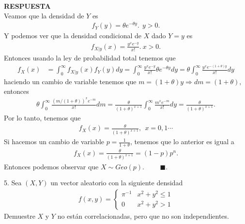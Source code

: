 \documentclass[11pt,letterpaper]{article}
\newcommand{\res}{\textbf{RESPUESTA}\\}
\newcommand{\fin}{$\blacksquare.$}
\newcommand{\fx}{f_X(x)}
\newcommand{\fy}{f_Y(y)}
\begin{document}
\res Veamos que la densidad de $Y$ es 
\begin{align*}
\fy = \theta e^{-\theta y}. \ \ y>0.
\end{align*}
Y podemos ver que la densidad condicional de $X$ dado $Y=y$ es
\begin{align*}
f_{X|y}(x)= \frac{y^xe^{-y}}{x!}. \ x>0.
\end{align*}
Entonces usando la ley de probabilidad total tenemos que 
\begin{align*}
\fx&=\int_0^\infty f_{X|y}(x)f_Y(y)dy = \int_0^\infty \frac{y^xe^{-y}}{x!}  \theta e^{-\theta y} dy = \theta\int_0^\infty \frac{y^x e^{-(1+\theta)y}}{x!}dy
\end{align*}
haciendo un cambio de variable tenemos que $m=(1+\theta)y\Rightarrow dm=(1+\theta),$ entonces
\begin{align*}
\theta\int_0^\infty \frac{(m/(1+\theta))^x e^{-m}}{x!}dm= \frac{\theta}{(1+\theta)^{x+1}}\int_0^\infty \frac{m^x e^{-m}}{x!}dy=\frac{\theta}{(1+\theta)^{x+1}}.
\end{align*}
Por lo tanto, tenemos que
\begin{align*}
\fx = \frac{\theta}{(1+\theta)^{x+1}}, \ \ x=0,1\cdots
\end{align*}
Si hacemos un cambio de variable $p=\frac{1}{1+\theta}$, tenemos que lo anterior es igual a 
\begin{align*}
\fx = \frac{\theta}{(1+\theta)^{x+1}}=(1-p)p^n.
\end{align*}
Entonces podemos observar que $X\sim Geo(p).$ \ \ \ \ \fin

5. Sea $(X, Y)$ un vector aleatorio con la siguiente densidad
\begin{align*}
f(x,y)=\left\{\begin{matrix}
\pi^{-1} & x^2+y^2\leq 1\\
0 & x^2+y^2>1
\end{matrix} \right.
\end{align*} 
Demuestre $X$ y $Y$ no están correlacionadas, pero que no son independientes.
\end{document}

